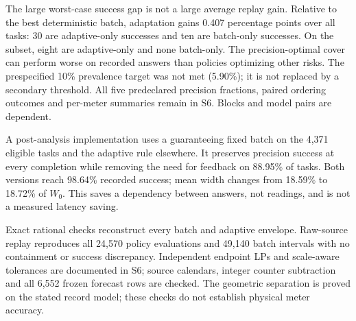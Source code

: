 The large worst-case success gap is not a large average replay gain.
Relative to the best deterministic batch, adaptation gains 0.407 percentage
points over all tasks: 30 are adaptive-only successes and ten are batch-only
successes. On the subset, eight are adaptive-only and none batch-only.
The precision-optimal cover can perform worse on recorded answers than
policies optimizing other risks. The prespecified 10\% prevalence target
was not met (5.90\%); it is not replaced by a secondary threshold.
All five predeclared precision fractions, paired ordering outcomes and
per-meter summaries remain in S6. Blocks and model pairs are dependent.

A post-analysis implementation uses a guaranteeing fixed batch on the
4,371 eligible tasks and the adaptive rule elsewhere. It preserves precision
success at every completion while removing the need for feedback on
88.95\% of tasks. Both versions reach 98.64\% recorded success; mean width
changes from 18.59\% to 18.72\% of $W_0$. This saves a dependency between
answers, not readings, and is not a measured latency saving.

Exact rational checks reconstruct every batch and adaptive envelope.
Raw-source replay reproduces all 24,570 policy evaluations and 49,140 batch
intervals with no containment or success discrepancy. Independent endpoint
LPs and scale-aware tolerances are documented in S6; source calendars,
integer counter subtraction and all 6,552 frozen forecast rows are checked.
The geometric separation is proved on the stated record model; these
checks do not establish physical meter accuracy.
